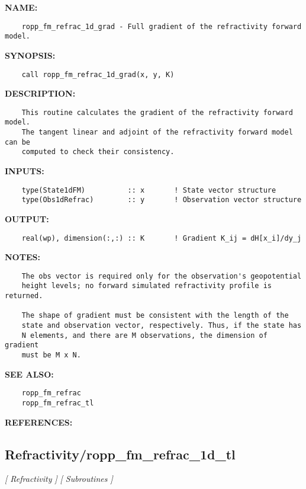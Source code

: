 \label{ch:robo78}
\label{ch:Refractivity_ropp_fm_refrac_1d_grad}
\textbf{NAME:}\hspace{0.08in}\begin{Verbatim}
    ropp_fm_refrac_1d_grad - Full gradient of the refractivity forward model.
\end{Verbatim}
\textbf{SYNOPSIS:}\hspace{0.08in}\begin{Verbatim}
    call ropp_fm_refrac_1d_grad(x, y, K)
\end{Verbatim}
\textbf{DESCRIPTION:}\hspace{0.08in}\begin{Verbatim}
    This routine calculates the gradient of the refractivity forward model.
    The tangent linear and adjoint of the refractivity forward model can be 
    computed to check their consistency.
\end{Verbatim}
\textbf{INPUTS:}\hspace{0.08in}\begin{Verbatim}
    type(State1dFM)          :: x       ! State vector structure   
    type(Obs1dRefrac)        :: y       ! Observation vector structure
\end{Verbatim}
\textbf{OUTPUT:}\hspace{0.08in}\begin{Verbatim}
    real(wp), dimension(:,:) :: K       ! Gradient K_ij = dH[x_i]/dy_j
\end{Verbatim}
\textbf{NOTES:}\hspace{0.08in}\begin{Verbatim}
    The obs vector is required only for the observation's geopotential 
    height levels; no forward simulated refractivity profile is returned.

    The shape of gradient must be consistent with the length of the
    state and observation vector, respectively. Thus, if the state has
    N elements, and there are M observations, the dimension of gradient
    must be M x N.
\end{Verbatim}
\textbf{SEE ALSO:}\hspace{0.08in}\begin{Verbatim}
    ropp_fm_refrac
    ropp_fm_refrac_tl
\end{Verbatim}
\textbf{REFERENCES:}\hspace{0.08in}\subsection{Refractivity/ropp\_fm\_refrac\_1d\_tl}
\textsl{[ Refractivity ]}
\textsl{[ Subroutines ]}


